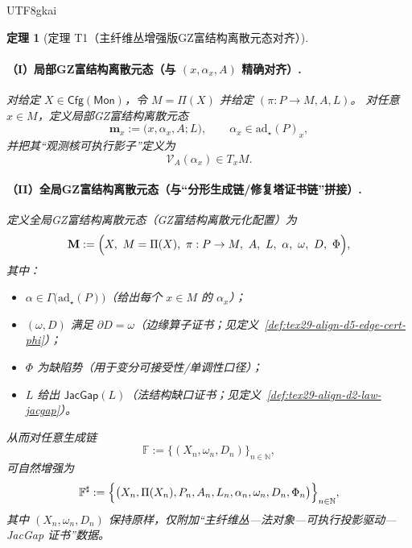 \documentclass[12pt]{article}
\newtheorem{theorem}{定理}[section]
\newcommand{\NN}{\mathbb{N}}
\newcommand{\GZMonization}{\texorpdfstring{GZ富结构离散元化}{GZ富结构离散元化}}
\newcommand{\GZMonState}{\texorpdfstring{GZ富结构离散元态}{GZ富结构离散元态}}
\begin{document}
\begin{CJK*}{UTF8}{gkai}
\begin{theorem}[定理 T1（主纤维丛增强版\GZMonState{}对齐）]
\paragraph{（I）局部\GZMonState{}（与 $(x,\alpha_x,A)$ 精确对齐）.}
对给定 $X\in\mathsf{Cfg}(\mathsf{Mon})$，令 $M=\Pi(X)$ 并给定 $(\pi:P\to M,A,L)$。
对任意 $x\in M$，定义局部\GZMonState{}
\[
  \mathbf{m}_x:=\bigl(x,\alpha_x,A;L\bigr),
  \qquad
  \alpha_x\in \mathrm{ad}_{\star}(P)_x,
\]
并把其“观测核可执行影子”定义为
\[
  \mathcal{V}_A(\alpha_x)\in T_xM.
\]

\paragraph{（II）全局\GZMonState{}（与“分形生成链/修复塔证书链”拼接）.}
定义全局\GZMonState{}（\GZMonization{}配置）为
\[
  \mathbf{M}:=\Bigl(X,\ M=\Pi(X),\ \pi:P\to M,\ A,\ L,\ \alpha,\ \omega,\ D,\ \Phi\Bigr),
\]
其中：
\begin{itemize}
  \item $\alpha\in\Gamma\bigl(\mathrm{ad}_{\star}(P)\bigr)$（给出每个 $x\in M$ 的 $\alpha_x$）；
  \item $(\omega,D)$ 满足 $\partial D=\omega$（边缘算子证书；见定义~\ref{def:tex29-align-d5-edge-cert-phi}）；
  \item $\Phi$ 为缺陷势（用于变分可接受性/单调性口径）；
  \item $L$ 给出 $\mathsf{JacGap}(L)$（法结构缺口证书；见定义~\ref{def:tex29-align-d2-law-jacgap}）。
\end{itemize}
从而对任意生成链
\[
  \mathbb{F}:=\bigl\{(X_n,\omega_n,D_n)\bigr\}_{n\in\NN},
\]
可自然增强为
\[
  \mathbb{F}^{\sharp}
  :=
  \Bigl\{\bigl(X_n,\Pi(X_n),P_n,A_n,L_n,\alpha_n,\omega_n,D_n,\Phi_n\bigr)\Bigr\}_{n\in\NN},
\]
其中 $(X_n,\omega_n,D_n)$ 保持原样，仅附加“主纤维丛—法对象—可执行投影驱动—JacGap 证书”数据。
\end{theorem}


\end{CJK*}
\end{document}
